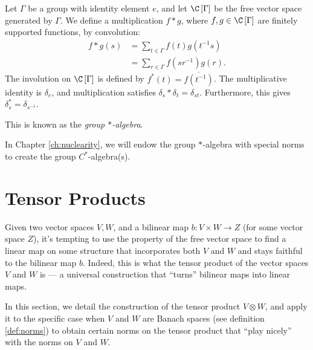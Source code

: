 \begin{definition}\label{def:group_star_algebra}
  Let $\Gamma$ be a group with identity element $e$, and let $\C\left[\Gamma\right]$ be the free vector space generated by $\Gamma$. We define a multiplication $f \ast g$, where $f,g\in \C\left[\Gamma\right]$ are finitely supported functions, by convolution:
  \begin{align*}
    f\ast g(s) &= \sum_{t\in\Gamma}f(t)g\left(t^{-1}s\right)\\
               &= \sum_{r\in\Gamma}f\left(sr^{-1}\right)g\left(r\right).
  \end{align*}
  The involution on $\C\left[\Gamma\right]$ is defined by $f^{\ast}\left(t\right) = \overline{f\left(t^{-1}\right)}$. The multiplicative identity is $\delta_e$, and multiplication satisfies $\delta_s\ast \delta_t = \delta_{st}$. Furthermore, this gives $\delta_{s}^{\ast} = \delta_{s^{-1}}$.\newline

  This is known as the \textit{group $\ast$-algebra}.
\end{definition}
\begin{remark}
  In Chapter \ref{ch:nuclearity}, we will endow the group $\ast$-algebra with special norms to create the group $C^{\ast}$-algebra(s).
\end{remark}
\section{Tensor Products}%
Given two vector spaces $V,W$, and a bilinear map $b\colon V\times W \rightarrow Z$ (for some vector space $Z$), it's tempting to use the property of the free vector space to find a linear map on some structure that incorporates both $V$ and $W$ and stays faithful to the bilinear map $b$. Indeed, this is what the tensor product of the vector spaces $V$ and $W$ is --- a universal construction that ``turns'' bilinear maps into linear maps.\newline

In this section, we detail the construction of the tensor product $V\otimes W$, and apply it to the specific case when $V$ and $W$ are Banach spaces (see definition \ref{def:norms}) to obtain certain norms on the tensor product that ``play nicely'' with the norms on $V$ and $W$.
